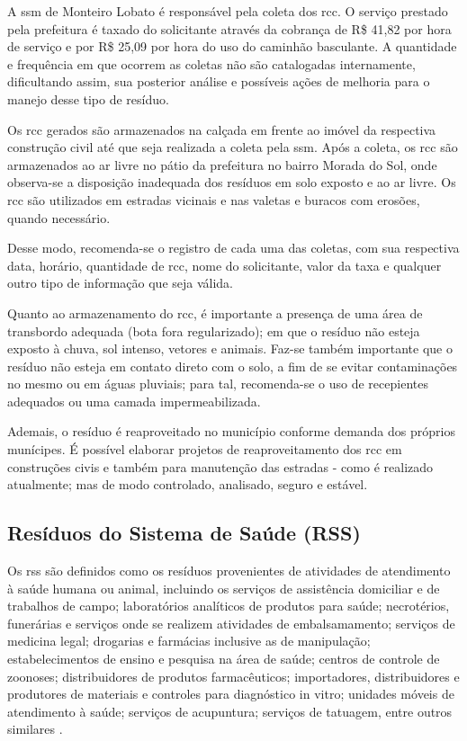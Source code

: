 	A \gls{ssm} de Monteiro Lobato é responsável pela coleta dos \gls{rcc}. O serviço prestado pela prefeitura é taxado do solicitante através da cobrança de R\$ 41,82 por hora de serviço e por R\$ 25,09 por hora do uso do caminhão basculante. A quantidade e frequência em que ocorrem as coletas não são catalogadas internamente, dificultando assim, sua posterior análise e possíveis ações de melhoria para o manejo desse tipo de resíduo.
		
	Os \gls{rcc} gerados são armazenados na calçada em frente ao imóvel da respectiva construção civil até que seja realizada a coleta pela \gls{ssm}. Após a coleta, os \gls{rcc} são armazenados ao ar livre no pátio da prefeitura no bairro Morada do Sol,  onde observa-se a disposição inadequada dos resíduos em solo exposto e ao ar livre. Os \gls{rcc} são utilizados em estradas vicinais e nas valetas e buracos com erosões, quando necessário.
	
	Desse modo, recomenda-se o registro de cada uma das coletas, com sua respectiva data, horário, quantidade de \gls{rcc}, nome do solicitante, valor da taxa e qualquer outro tipo de informação que seja válida.
	
	Quanto ao armazenamento do \gls{rcc}, é importante a presença de uma área de transbordo adequada (bota fora regularizado); em que o resíduo não esteja exposto à chuva, sol intenso, vetores e animais. Faz-se também importante que o resíduo não esteja em contato direto com o solo, a fim de se evitar contaminações no mesmo ou em águas pluviais; para tal, recomenda-se o uso de recepientes adequados ou uma camada impermeabilizada.
	
	Ademais, o resíduo é reaproveitado no município conforme demanda dos próprios munícipes. É possível elaborar projetos de reaproveitamento dos \gls{rcc} em construções civis e também para manutenção das estradas - como é realizado atualmente; mas de modo controlado, analisado, seguro e estável.
	
	\subsection{Resíduos do Sistema de Saúde (RSS)}
	Os \gls{rss} são definidos como os resíduos provenientes de atividades de atendimento à saúde humana ou animal, incluindo os serviços de assistência domiciliar e de trabalhos de campo; laboratórios analíticos de produtos para saúde; necrotérios, funerárias e serviços onde se realizem atividades de embalsamamento; serviços de medicina legal; drogarias e farmácias inclusive as de manipulação; estabelecimentos de ensino e pesquisa na área de saúde; centros de controle de zoonoses; distribuidores de produtos farmacêuticos; importadores, distribuidores e produtores de materiais e controles para diagnóstico in vitro; unidades móveis de atendimento à saúde; serviços de acupuntura; serviços de tatuagem, entre outros similares \cite{conama:362}.
	
